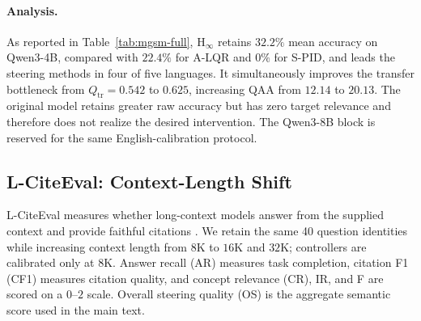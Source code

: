 \paragraph{Analysis.}
As reported in Table~\ref{tab:mgsm-full}, $\mathrm{H}_{\infty}$ retains
$32.2\%$ mean accuracy on Qwen3-4B, compared
with $22.4\%$ for A-LQR and $0\%$ for S-PID, and leads the steering methods in
four of five languages.  It simultaneously improves the transfer bottleneck
from $Q_{\mathrm{tr}}=0.542$ to $0.625$, increasing QAA from $12.14$ to
$20.13$.  The original model retains greater raw accuracy but has zero target
relevance and therefore does not realize the desired intervention.  The
Qwen3-8B block is reserved for the same English-calibration protocol.

\FloatBarrier



\subsection{L-CiteEval: Context-Length Shift}
\label{app:lciteeval-full}

L-CiteEval measures whether long-context models answer from the supplied
context and provide faithful citations \citep{tang2024lciteeval}.  We retain
the same 40 question identities while increasing context length from $8$K to
$16$K and $32$K; controllers are calibrated only at $8$K.  Answer recall (AR)
measures task completion, citation F1 (CF1) measures citation quality, and
concept relevance (CR), IR, and F are scored on a $0$--$2$ scale.  Overall
steering quality (OS) is the aggregate semantic score used in the main text.

